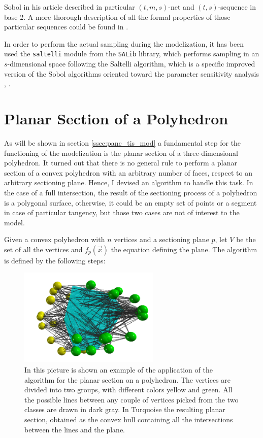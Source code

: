     Sobol in his article described in particular $(t,m,s)$-net and $(t,s)$-sequence in base 2. A more thorough description of all the formal properties of those particular sequences could be found in \cite{SOBOL1976236}.

    In order to perform the actual sampling during the modelization, it has been used the \texttt{saltelli} module from the \texttt{SALib} library, which performs sampling in an $s$-dimensional space following the Saltelli algorithm, which is a specific improved version of the Sobol algorithms oriented toward the parameter sensitivity analysis \cite{SALTELLI2002280}, \cite{SALTELLI2010259}.


\section{Planar Section of a Polyhedron} \label{ssec:pol_sec}
    As will be shown in section \ref{ssec:panc_tis_mod} a fundamental step for the functioning of the modelization is the planar section of a three-dimensional polyhedron. It turned out that there is no general rule to perform a planar section of a convex polyhedron with an arbitrary number of faces, respect to an arbitrary sectioning plane. Hence, I devised an algorithm to handle this task. In the case of a full intersection, the result of the sectioning process of a polyhedron is a polygonal surface, otherwise, it could be an empty set of points or a segment in case of particular tangency, but those two cases are not of interest to the model.

    Given a convex polyhedron with $n$ vertices and a sectioning plane $p$, let $V$ be the set of all the vertices and $f_p(\vec x)$ the equation defining the plane. The algorithm is defined by the following steps:

    \begin{figure}
        \centering
        \includegraphics[width = 0.6\textwidth]{images/sec_pol}
        \caption{In this picture is shown an example of the application of the algorithm for the planar section on a polyhedron. The vertices are divided into two groups, with different colors yellow and green. All the possible lines between any couple of vertices picked from the two classes are drawn in dark gray. In Turquoise the resulting planar section, obtained as the convex hull containing all the intersections between the lines and the plane.}
        \label{fig:sec_pol}
    \end{figure}

